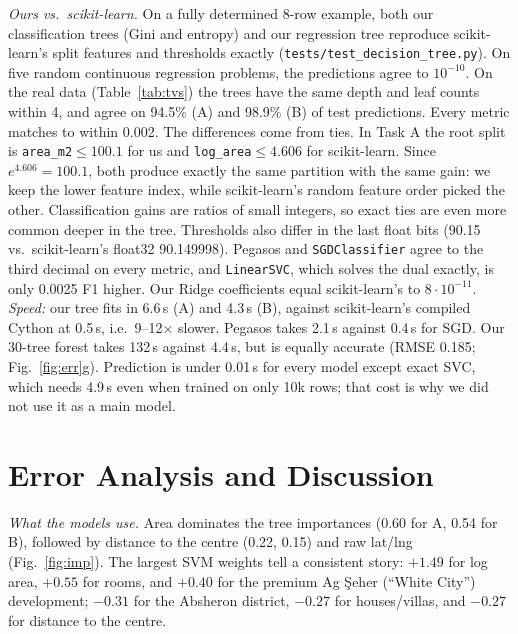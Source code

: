 \documentclass[10pt,twocolumn,a4paper]{article}
\begin{document}
\emph{Ours vs.\ scikit-learn.} On a fully determined 8-row example, both
our classification trees (Gini and entropy) and our regression tree
reproduce scikit-learn's split features and thresholds exactly
(\texttt{tests/test\_decision\_tree.py}). On five random continuous
regression problems, the predictions agree to $10^{-10}$. On the real data
(Table~\ref{tab:tvs}) the trees have the same depth and leaf counts within
4, and agree on 94.5\% (A) and 98.9\% (B) of test predictions. Every metric
matches to within 0.002. The differences come from ties. In Task A the
root split is \texttt{area\_m2}${}\le100.1$ for us and
\texttt{log\_area}${}\le4.606$ for scikit-learn. Since $e^{4.606}=100.1$,
both produce exactly the same partition with the same gain: we keep the
lower feature index, while scikit-learn's random feature order picked the
other. Classification gains are ratios of small integers, so exact ties are
even more common deeper in the tree. Thresholds also differ in the last
float bits (90.15 vs.\ scikit-learn's float32 90.149998). Pegasos and
\texttt{SGDClassifier} agree to the third decimal on every metric, and
\texttt{LinearSVC}, which solves the dual exactly, is only 0.0025 F1 higher.
Our Ridge coefficients equal scikit-learn's to $8\cdot10^{-11}$.
\emph{Speed:} our tree fits in 6.6\,s (A) and 4.3\,s (B), against
scikit-learn's compiled Cython at 0.5\,s, i.e.\ 9--12$\times$ slower.
Pegasos takes 2.1\,s against 0.4\,s for SGD. Our 30-tree forest takes
132\,s against 4.4\,s, but is equally accurate (RMSE 0.185;
Fig.~\ref{fig:err}g). Prediction is under 0.01\,s for every model except
exact SVC, which needs 4.9\,s even when trained on only 10k rows; that cost
is why we did not use it as a main model.

\begin{table}[t]
  \centering\scriptsize
  \setlength{\tabcolsep}{2.5pt}
  \caption{Tree structure: ours vs.\ scikit-learn (same hyper-parameters).}
  \label{tab:tvs}
  
\end{table}

\section{Error Analysis and Discussion}
\emph{What the models use.} Area dominates the tree importances (0.60 for
A, 0.54 for B), followed by distance to the centre (0.22, 0.15) and raw
lat/lng (Fig.~\ref{fig:imp}). The largest SVM weights tell a consistent
story: $+1.49$ for log area, $+0.55$ for rooms, and $+0.40$ for the
premium Ag \c{S}eher (``White City'') development; $-0.31$ for the Absheron district, $-0.27$
for houses/villas, and $-0.27$ for distance to the centre.
\end{document}
